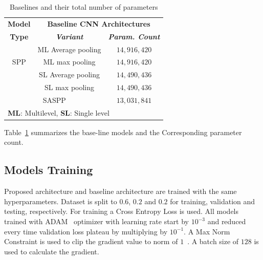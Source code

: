 \begin{table}[htbp]
\caption{Baselines and their total number of parameters}
\begin{center}
\begin{tabular}{|c|c|c|}
\hline
\textbf{Model}&\multicolumn{2}{|c|}{\textbf{Baseline CNN Architectures}} \\
\cline{2-3} 
\textbf{Type} & \textbf{\textit{Variant}}& \textbf{\textit{Param. Count}} \\
\hline
  & ML Average pooling & $14,916,420$   \\
\cline{2-3} 
SPP & ML max pooling & $14,916,420$   \\
\cline{2-3} 
  & SL Average pooling & $14,490,436$   \\
\cline{2-3} 
  & SL max pooling & $14,490,436$ \\
\hline
\multicolumn{2}{|c|}{SASPP} & $13,031,841$\\
\hline
\multicolumn{3}{l}{ \textbf{ML}: Multilevel, \textbf{SL}: Single level}
\end{tabular}
\label{Basarch}
\end{center}
\end{table}
Table~\ref{Basarch} summarizes the base-line models and the Corresponding parameter count.
\subsection{Models Training}
Proposed architecture and baseline architecture are trained with the same hyperparameters. Dataset is split to $0.6$, $0.2$ and $0.2$ for training, validation and testing, respectively. For training a Cross Entropy Loss is used. All models trained with ADAM~\cite{kingma2014adam} optimizer with learning rate start by $10^{-3}$ and reduced every time validation loss plateau by multiplying by $10^{-1}$. A Max Norm Constraint is used to clip the gradient value to norm of $1$~\cite{krizhevsky2012imagenet}. A batch size of $128$ is used to calculate the gradient.
